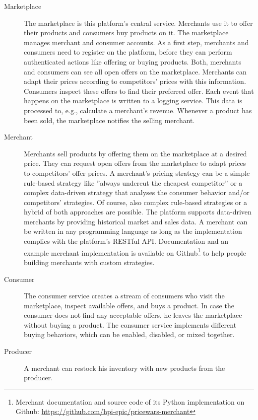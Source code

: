 \begin{description}
	\item [Marketplace]
		The marketplace is this platform's central service.
		Merchants use it to offer their products and consumers buy products on it.
		The marketplace manages merchant and consumer accounts.
		As a first step, merchants and consumers need to register on the platform, before they can perform authenticated actions like offering or buying products.
		Both, merchants and consumers can see all open offers on the marketplace.
		Merchants can adapt their prices according to competitors' prices with this information.
		Consumers inspect these offers to find their preferred offer.
		Each event that happens on the marketplace is written to a logging service.
		This data is processed to, e.g., calculate a merchant's revenue.
		Whenever a product has been sold, the marketplace notifies the selling merchant.
	\item [Merchant]
		Merchants sell products by offering them on the marketplace at a desired price.
		They can request open offers from the marketplace to adapt prices to competitors' offer prices.
		A merchant's pricing strategy can be a simple rule-based strategy like ''always undercut the cheapest competitor'' or a complex data-driven strategy that analyses the consumer behavior and/or competitors' strategies.
		Of course, also complex rule-based strategies or a hybrid of both approaches are possible.
		The \pricewars platform supports data-driven merchants by providing historical market and sales data.
		A merchant can be written in any programming language as long as the implementation complies with the platform's RESTful API.
		Documentation and an example merchant implementation is available on Github\footnote{\pricewars Merchant documentation and source code of its Python implementation on Github: \url{https://github.com/hpi-epic/pricewars-merchant}} to help people building merchants with custom strategies.
	\item [Consumer]
		The consumer service creates a stream of consumers who visit the marketplace, inspect available offers, and buys a product.
		In case the consumer does not find any acceptable offers, he leaves the marketplace without buying a product.
		The consumer service implements different buying behaviors, which can be enabled, disabled, or mixed together.
	\item [Producer]
		A merchant can restock his inventory with new products from the producer.

\end{description}
